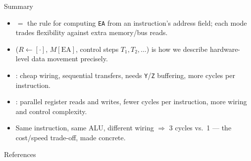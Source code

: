 \documentclass[aspectratio=169]{beamer}
\begin{document}
\begin{frame}{Summary}
  \begin{itemize}
    \item {} $=$ the rule for computing \texttt{EA} from an
      instruction's address field; each mode trades flexibility against extra
      memory/bus reads.
    \item {} ($R \gets [\cdot]$, $M[\text{EA}]$, control steps
      $T_1, T_2, \dots$) is how we describe hardware-level data movement precisely.
    \item {}: cheap wiring, sequential transfers, needs
      \texttt{Y}/\texttt{Z} buffering, more cycles per instruction.
    \item {}: parallel register reads and writes,
      fewer cycles per instruction, more wiring and control complexity.
    \item Same instruction, same ALU, different wiring $\Rightarrow$ 3 cycles vs.\ 1
      --- the cost/speed trade-off, made concrete.
  \end{itemize}
\end{frame}

\begin{frame}{References}
  \footnotesize
  
  
\end{frame}
\end{document}
